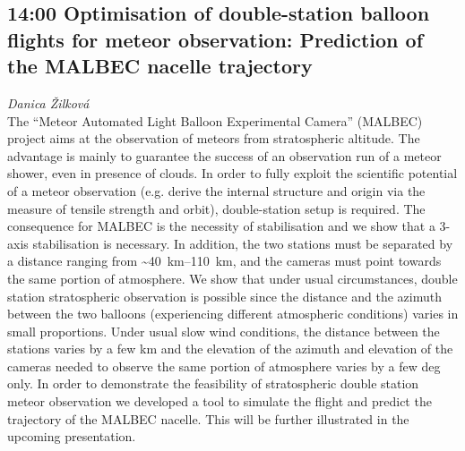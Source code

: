 \documentclass[a4paper]{report}
\begin{document}
                                    \begin{tcolorbox}
                            \subsection{14:00 \hfill Optimisation of double-station balloon flights for meteor observation: Prediction of the MALBEC nacelle trajectory}
                                    \hfill \textit{Danica Žilková} \\
                                                    The “Meteor Automated Light Balloon Experimental Camera” (MALBEC) project aims at the observation of meteors from stratospheric altitude. The advantage is mainly to guarantee the success of an observation run of a meteor shower, even in presence of clouds. In order to fully exploit the scientific potential of a meteor observation (e.g. derive the internal structure and origin via the measure of tensile strength and orbit), double-station setup is required. The consequence for MALBEC is the necessity of stabilisation and we show that a 3-axis stabilisation is necessary. In addition, the two stations must be separated by a distance ranging from \textasciitilde\SIrange{40}{110}{\kilo\metre}, and the cameras must point towards the same portion of atmosphere. We show that under usual circumstances, double station stratospheric observation is possible since the distance and the azimuth between the two balloons (experiencing different atmospheric conditions) varies in small proportions. Under usual slow wind conditions, the distance between the stations varies by a few km and the elevation of the azimuth and elevation of the cameras needed to observe the same portion of atmosphere varies by a few deg only. In order to demonstrate the feasibility of stratospheric double station meteor observation we developed a tool to simulate the flight and predict the trajectory of the MALBEC nacelle. This will be further illustrated in the upcoming presentation.

                                            \end{tcolorbox}
                                \section{\color[rgb]{0, 0.1, 0.4}{nedeľa}}
\end{document}
